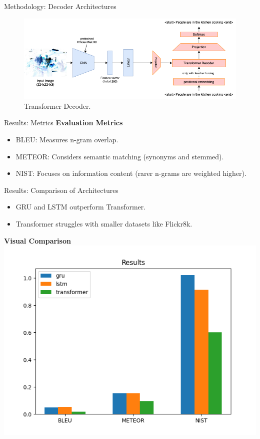 \documentclass[10pt]{beamer}
\theoremstyle{remark}
\begin{document}
\begin{frame}{Methodology: Decoder Architectures}
	\begin{figure}[H]
		\includegraphics[width=.9\textwidth]{res/transformer.png}
		\caption{Transformer Decoder.}\label{fig:transformer}
	\end{figure}
\end{frame}

\begin{frame}{Results: Metrics}
	\textbf{Evaluation Metrics}
	\begin{itemize}
			\item BLEU: Measures n-gram overlap.
			\item METEOR: Considers semantic matching (synonyms and stemmed).
			\item NIST: Focuses on information content (rarer n-grams are weighted higher).
	\end{itemize}
\end{frame}

\begin{frame}{Results: Comparison of Architectures}
	\begin{itemize}
			\item GRU and LSTM outperform Transformer.
			\item Transformer struggles with smaller datasets like Flickr8k.
	\end{itemize}
	\textbf{Visual Comparison}
	\includegraphics[width=.6\textwidth]{res/metrics.png}
\end{frame}
\end{document}
